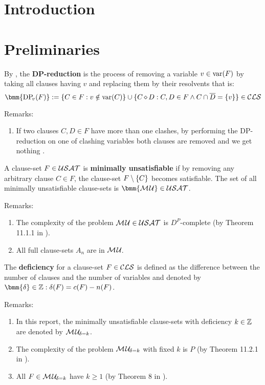 \documentclass{article}
\begin{document}
\section{Introduction}
\label{sec:intro}

\section{Preliminaries}
\label{cha:Preliminaries}

\begin{defi}\label{def:dpredc}
By \cite{KullmannZhao2010Extremal}, the \textbf{DP-reduction} is the process of removing a variable $v \in \operatorname{var}(F)$ by taking all clauses having $v$ and replacing them by their resolvents that is:
\begin{displaymath}
\bmm{\dpi{v}(F)} := \set{C \in F : v \notin \var(C)} \cup \set{C \res D : C, D \in F \und C \cap \ol{D} = \set{v}} \in \Cls
\end{displaymath}
\end{defi}
Remarks:
  \begin{enumerate}
  \item If two clauses $C,D \in F$ have more than one clashes, by performing the DP-reduction on one of clashing variables both clauses are removed and we get nothing .
   \end{enumerate}
   
\begin{defi}\label{def:mu}
A clause-set $F \in \mathcal{USAT}$ is \textbf{minimally unsatisfiable} if by removing any arbitrary clause $C \in F$, the clause-set $F \setminus \{ C \}$ becomes satisfiable. The set of all minimally unsatisfiable clause-sets is $\bmm{\Musat} \in \Usat$.
\end{defi}
Remarks:
  \begin{enumerate}
  \item The complexity of the problem $\mathcal{M\hspace{0.8pt}U} \in \mathcal{USAT}$ is $D^P$-complete (by Theorem 11.1.1 in \cite{Kullmann2007HandbuchMU}).
  \item All full clause-sets $ A_n$ are in $\mathcal{M\hspace{0.8pt}U}_{\!}$.
  \end{enumerate}

\begin{defi}\label{def:deficiency}
The \textbf{deficiency} for a clause-set $F \in \mathcal{CLS}$ is defined as the difference between the number of clauses and the number of variables and denoted by $\bmm{\delta} \in \ZZ: \delta(F)= c(F) - n(F)$.
\end{defi}
Remarks:
  \begin{enumerate}
  \item In this report, the minimally unsatisfiable clause-sets with deficiency $k \in \mathbb{Z}$ are denoted by $\mathcal{M\hspace{0.8pt}U}_{\!\delta=k}$.
  \item The complexity of the problem $\mathcal{M\hspace{0.8pt}U}_{\!\delta=k}$ with fixed $k$ is $P$ (by Theorem 11.2.1 in \cite{Kullmann2007HandbuchMU}).
  \item All $F \in \mathcal{M\hspace{0.8pt}U}_{\!\delta=k}$ have $k \ge 1$ (by Theorem 8 in \cite{DDK98}).
  \end{enumerate}
\end{document}
